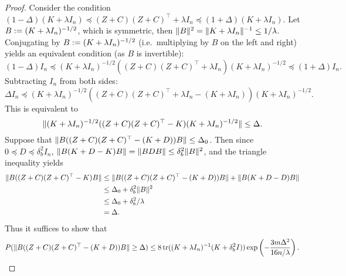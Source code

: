 \begin{proof}
  Consider the condition $(1 - \Delta)(K + \lambda I_n) \preceq (Z + C) (Z + C)^\top + \lambda I_n \preceq (1 +
  \Delta)(K + \lambda I_n)$.
  Let $B := (K + \lambda I_n)^{-1/2}$, which is symmetric, then $\|B\|^2 =
  \|K + \lambda I_n\|^{-1} \leq 1/\lambda$.
  Conjugating by $B := (K + \lambda I_n)^{-1/2}$ (i.e.\ multiplying by $B$ on the
  left and right) yields an equivalent condition (as $B$ is
  invertible):
  \begin{equation*}
    (1 - \Delta) I_n \preceq (K + \lambda I_n)^{-1/2} ((Z + C) (Z + C)^\top + \lambda I_n) (K + \lambda I_n)^{-1/2} \preceq (1 +
    \Delta) I_n.
  \end{equation*}
  Subtracting $I_n$ from both sides:
  \begin{equation*}
    \Delta I_n \preceq (K + \lambda I_n)^{-1/2} ((Z + C) (Z + C)^\top + \lambda I_n - (K + \lambda I_n)) (K + \lambda I_n)^{-1/2}.
  \end{equation*}
  This is equivalent to
  \begin{equation*}
    \|(K + \lambda I_n)^{-1/2} ((Z + C) (Z + C)^\top - K) (K + \lambda I_n)^{-1/2}\| \leq \Delta.
  \end{equation*}
  Suppose that $\|B((Z + C)(Z + C)^\top - (K + D))B\| \leq \Delta_0$.
  Then since $0 \preceq D \preceq \delta^2_b I_n$, $\|B(K + D - K) B\| = \|B D B\| \leq \delta^2_b
  \|B\|^2$, and the triangle inequality yields
  \begin{align*}
    \|B((Z + C)(Z + C)^\top - K)B\|
    &\leq \|B((Z + C)(Z + C)^\top - (K + D))B\| + \|B (K + D - D)B\| \\
    &\leq \Delta_0 + \delta^2_b \|B\|^2 \\
    &\leq \Delta_0 + \delta^2_b/\lambda \\
    &= \Delta.
  \end{align*}
  Thus it suffices to show that
  \begin{equation*}
    P(\|B((Z + C)(Z + C)^\top - (K + D))B\| \geq \Delta) \leq 8 \mathop{\rm tr}((K + \lambda I_n)^{-1} (K +
    \delta^2_b I)) \exp \left( -\frac{3m \Delta^2}{16n/\lambda} \right).
  \end{equation*}


\end{proof}
